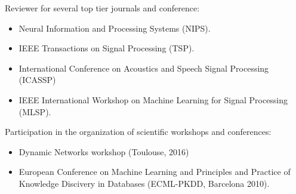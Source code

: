 \documentclass[paper=a4,fontsize=11pt]{temp} %
\begin{document}
Reviewer for several top tier journals and conference:
\begin{itemize}
\item Neural Information and Processing Systems (NIPS).
\item IEEE Transactions on Signal Processing (TSP).
\item International Conference on Acoustics and Speech Signal Processing (ICASSP)
\item  IEEE International Workshop on Machine Learning for Signal Processing (MLSP).
\end{itemize}
Participation in the organization of scientific workshops and conferences:
\begin{itemize}
\item Dynamic Networks workshop (Toulouse, 2016)
\item European Conference on Machine Learning and Principles and Practice of Knowledge Discivery in Databases (ECML-PKDD, Barcelona 2010).
\end{itemize}
\end{document}
